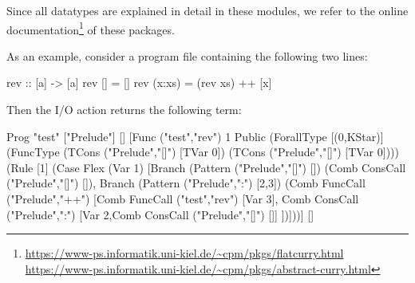 {Since all datatypes are explained in detail in these modules,
we refer to the online documentation\footnote{%
\url{https://www-ps.informatik.uni-kiel.de/~cpm/pkgs/flatcurry.html}\\
\url{https://www-ps.informatik.uni-kiel.de/~cpm/pkgs/abstract-curry.html}}
of these packages.

As an example, consider a program file 
containing the following two lines:
\begin{curry}
rev :: [a] -> [a]
rev []     = []
rev (x:xs) = (rev xs) ++ [x]
\end{curry}
Then the I/O action  returns the
following term:
\begin{curry}
Prog "test"
  ["Prelude"]
  []
  [Func ("test","rev") 1 Public
    (ForallType [(0,KStar)] (FuncType (TCons ("Prelude","[]") [TVar 0])
                                      (TCons ("Prelude","[]") [TVar 0])))
    (Rule [1]
       (Case Flex (Var 1)
          [Branch (Pattern ("Prelude","[]") [])
             (Comb ConsCall ("Prelude","[]") []),
           Branch (Pattern ("Prelude",":") [2,3])
             (Comb FuncCall ("Prelude","++")
                   [Comb FuncCall ("test","rev") [Var 3],
                    Comb ConsCall ("Prelude",":")
                         [Var 2,Comb ConsCall ("Prelude","[]") []]
                   ])]))]
  []
\end{curry}


\newpage


}
